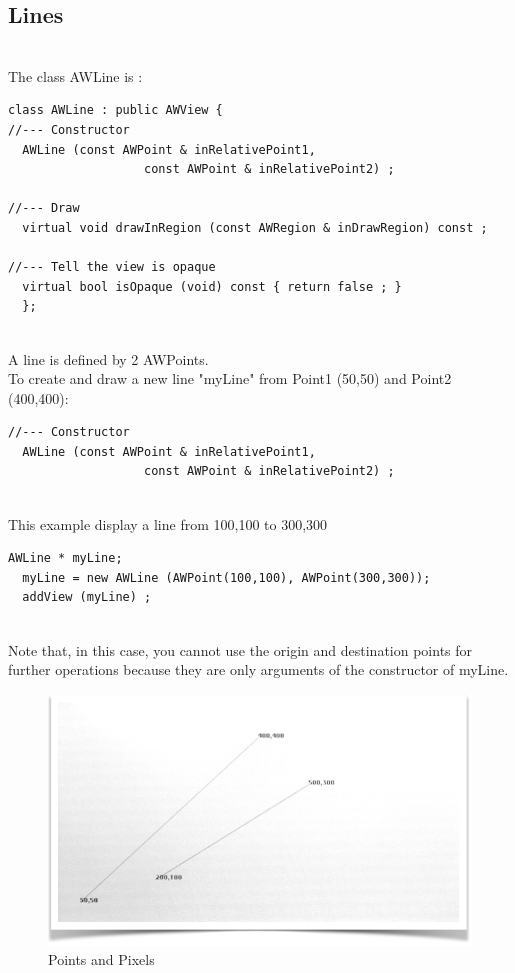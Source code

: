 \documentclass[a4paper,11pt]{extarticle}
\begin{document}
\subsection{Lines}

~\\ The class AWLine is :

\begin{lstlisting}[language=Arduinonl]
class AWLine : public AWView {
//--- Constructor
  AWLine (const AWPoint & inRelativePoint1,
                   const AWPoint & inRelativePoint2) ;

//--- Draw
  virtual void drawInRegion (const AWRegion & inDrawRegion) const ;

//--- Tell the view is opaque
  virtual bool isOpaque (void) const { return false ; }
  };
 \end{lstlisting}

~\\ A line is defined by 2 AWPoints. 
~\\ To create and draw a new line "myLine" from Point1 (50,50) and Point2 (400,400):

\begin{lstlisting}[language=Arduinonl]
//--- Constructor
  AWLine (const AWPoint & inRelativePoint1,
                   const AWPoint & inRelativePoint2) ;
 \end{lstlisting}

~\\ This example display a line from 100,100 to 300,300

\begin{lstlisting}[language=Arduinonl]
AWLine * myLine;
  myLine = new AWLine (AWPoint(100,100), AWPoint(300,300)); 
  addView (myLine) ;
 \end{lstlisting}
~\\ Note that, in this case, you cannot use the origin and destination points for further operations because they are only arguments of the constructor of myLine.

\begin{figure}[htbp]
   \centering
   \includegraphics[scale=0.7]{AWFig4.png} 
   \caption{Points and Pixels}
   \label{fig:4 }
\end{figure}
\end{document}
